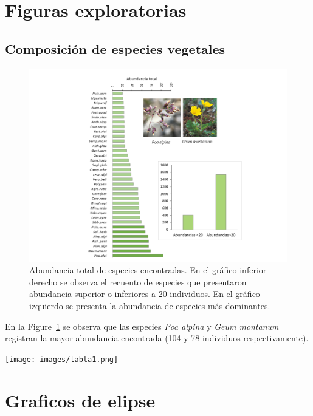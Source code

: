 \documentclass[
  letterpaper,
  DIV=11,
  numbers=noendperiod]{scrartcl}
\begin{document}
\hypertarget{figuras-exploratorias}{%
\section{Figuras exploratorias}\label{figuras-exploratorias}}

\hypertarget{composiciuxf3n-de-especies-vegetales}{%
\subsection{Composición de especies
vegetales}\label{composiciuxf3n-de-especies-vegetales}}

\begin{figure}

{\centering \includegraphics[width=5.65625in,height=\textheight]{figura_1_comp_especies.png}

}

\caption{\label{fig-abudancia}Abundancia total de especies encontradas.
En el gráfico inferior derecho se observa el recuento de especies que
presentaron abundancia superior o inferiores a 20 individuos. En el
gráfico izquierdo se presenta la abundancia de especies más dominantes.}

\end{figure}

En la Figure~\ref{fig-abudancia} se observa que las especies \emph{Poa
alpina} y \emph{Geum montanum} registran la mayor abundancia encontrada
(104 y 78 individuos respectivamente).

\texttt{[image: images/tabla1.png]}

\hypertarget{graficos-de-elipse}{%
\section{Graficos de elipse}\label{graficos-de-elipse}}
\end{document}
